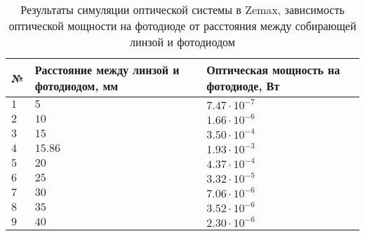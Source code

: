 \begin{table}
    \caption{Результаты симуляции оптической системы в Zemax, зависимость оптической мощности на фотодиоде от расстояния между собирающей линзой и фотодиодом}
    \label{tab:lens_simulation}
    \begin{tabularx}{\textwidth} {
        | l
        | >{\centering\arraybackslash}X
        | >{\centering\arraybackslash}X | }
        \hline
            № & Расстояние между линзой и фотодиодом, мм & Оптическая мощность на фотодиоде, Вт \\ \hline
            $1$ & $5$ & $7.47 \cdot 10^{-7}$ \\ \hline
            $2$ & $10$ & $1.66 \cdot 10^{-6}$ \\ \hline
            $3$ & $15$ & $3.50 \cdot 10^{-4}$ \\ \hline
            $4$ & $15.86$ & $1.93 \cdot 10^{-3}$ \\ \hline
            $5$ & $20$ & $4.37 \cdot 10^{-4}$ \\ \hline
            $6$ & $25$ & $3.32 \cdot 10^{-5}$ \\ \hline
            $7$ & $30$ & $7.06 \cdot 10^{-6}$ \\ \hline
            $8$ & $35$ & $3.52 \cdot 10^{-6}$ \\ \hline
            $9$ & $40$ & $2.30 \cdot 10^{-6}$ \\ \hline           
    \end{tabularx}
\end{table}